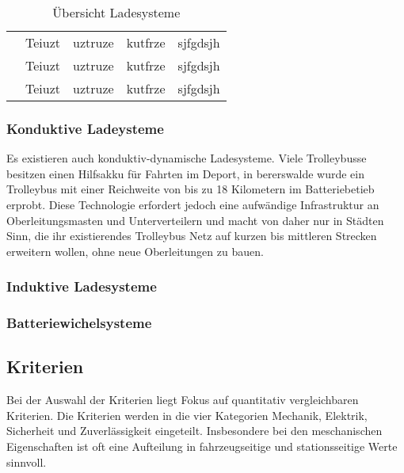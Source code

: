 \documentclass[twoside]{scrartcl}
\begin{document}
\begin{table}[htbp]
\begin{tabularx}{\linewidth}{lXXXX}
		                           & Teiuzt                             & uztruze                           & kutfrze                       & sjfgdsjh                                     \\
		                           & Teiuzt                             & uztruze                           & kutfrze                       & sjfgdsjh                                     \\
		                           & Teiuzt                             & uztruze                           & kutfrze                       & sjfgdsjh                                     \\ \bottomrule
	\end{tabularx}
	\caption{Übersicht Ladesysteme}
\end{table}

\subsubsection{Konduktive Ladeysteme}
Es existieren auch konduktiv-dynamische Ladesysteme. Viele Trolleybusse besitzen einen Hilfsakku für Fahrten im Deport, in bererswalde wurde ein Trolleybus mit einer Reichweite von bis zu 18 Kilometern im Batteriebetieb erprobt. %
Diese Technologie erfordert jedoch eine aufwändige Infrastruktur an Oberleitungsmasten und Unterverteilern und macht von daher nur in Städten Sinn, die ihr existierendes Trolleybus Netz auf kurzen bis mittleren Strecken erweitern wollen, ohne neue Oberleitungen zu bauen.

\subsubsection{Induktive Ladesysteme}

\subsubsection{Batteriewichelsysteme}

\subsection{Kriterien}
Bei der Auswahl der Kriterien liegt Fokus auf quantitativ vergleichbaren Kriterien. Die Kriterien werden in die vier Kategorien Mechanik, Elektrik, Sicherheit und Zuverlässigkeit eingeteilt. Insbesondere bei den meschanischen Eigenschaften ist oft eine Aufteilung in fahrzeugseitige und stationsseitige Werte sinnvoll.
\end{document}
